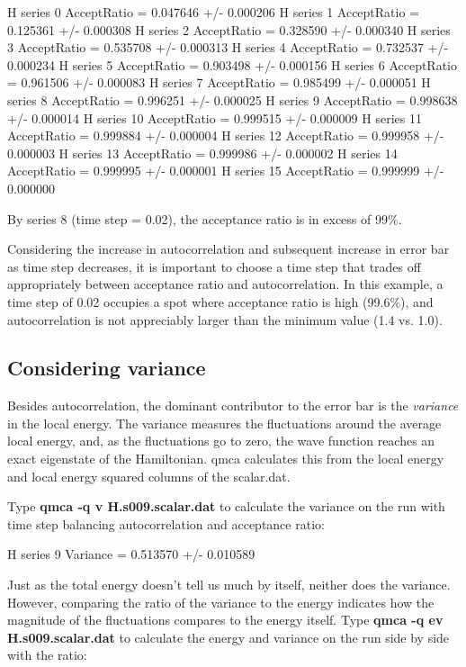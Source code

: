 \begin{shade} 
H  series 0  AcceptRatio = 0.047646 +/- 0.000206 
H  series 1  AcceptRatio = 0.125361 +/- 0.000308 
H  series 2  AcceptRatio = 0.328590 +/- 0.000340 
H  series 3  AcceptRatio = 0.535708 +/- 0.000313 
H  series 4  AcceptRatio = 0.732537 +/- 0.000234 
H  series 5  AcceptRatio = 0.903498 +/- 0.000156 
H  series 6  AcceptRatio = 0.961506 +/- 0.000083 
H  series 7  AcceptRatio = 0.985499 +/- 0.000051 
H  series 8  AcceptRatio = 0.996251 +/- 0.000025 
H  series 9  AcceptRatio = 0.998638 +/- 0.000014 
H  series 10  AcceptRatio = 0.999515 +/- 0.000009 
H  series 11  AcceptRatio = 0.999884 +/- 0.000004 
H  series 12  AcceptRatio = 0.999958 +/- 0.000003 
H  series 13  AcceptRatio = 0.999986 +/- 0.000002 
H  series 14  AcceptRatio = 0.999995 +/- 0.000001 
H  series 15  AcceptRatio = 0.999999 +/- 0.000000 
\end{shade}

By series 8 (time step = 0.02), the acceptance ratio is in excess of 99\%.  

Considering the increase in autocorrelation and subsequent increase in error
bar as time step decreases, it is important to choose a time step that trades
off appropriately between acceptance ratio and autocorrelation.  In this
example, a time step of 0.02 occupies a spot where acceptance ratio is high
(99.6\%), and autocorrelation is not appreciably larger than the minimum value
(1.4 vs. 1.0).

\subsection{Considering variance}

Besides autocorrelation, the dominant contributor to the error bar is the
\textit{variance} in the local energy.  The variance measures the fluctuations
around the average local energy, and, as the fluctuations go to zero, the wave
function reaches an exact eigenstate of the Hamiltonian.  qmca calculates this
from the local energy and local energy squared columns of the scalar.dat. 

Type \textbf{qmca -q v H.s009.scalar.dat} to calculate the variance on the run
with time step balancing autocorrelation and acceptance ratio:

\begin{shade}
H  series 9  Variance = 0.513570 +/- 0.010589  
\end{shade}

Just as the total energy doesn't tell us much by itself, neither does the
variance.  However, comparing the ratio of the variance to the energy indicates
how the magnitude of the fluctuations compares to the energy itself.   Type
\textbf{qmca -q ev H.s009.scalar.dat} to calculate the energy and variance on
the run side by side with the ratio:

